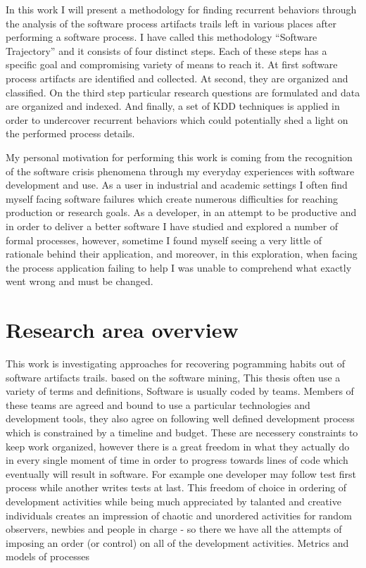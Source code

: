 In this work I will present a methodology for finding recurrent behaviors through the 
analysis of the software process artifacts trails left in various places after performing a 
software process. I have called this methodology ``Software Trajectory'' and it consists 
of four distinct steps. Each of these steps has a specific goal and compromising variety of 
means to reach it. 
At first software process artifacts are identified and collected. 
At second, they are organized and classified. 
On the third step particular research questions are formulated and data are organized and indexed. 
And finally, a set of KDD techniques is applied in order to undercover recurrent behaviors which 
could potentially shed a light on the performed process details. 

My personal motivation for performing this work is coming from the recognition of the 
software crisis phenomena through my everyday experiences with software development and use. 
As a user in industrial and academic settings I often find myself facing software failures 
which create numerous difficulties for reaching production or research goals. As a developer, 
in an attempt to be productive and in order to deliver a better software I have studied and 
explored a number of formal processes, however, sometime I found myself seeing a very little of 
rationale behind their application, and moreover, in this exploration, when facing the process
application failing to help I was unable to comprehend what exactly went wrong and must be changed. 

\section{Research area overview}
This work is investigating approaches for recovering pogramming habits out of 
software artifacts trails. based on the software mining, This thesis often use a variety of terms and
definitions, 
Software is usually coded by teams. Members of these teams are agreed and bound to use 
a particular technologies and development tools, they also agree on following well defined 
development process which is constrained by a timeline and budget. These are necessery 
constraints to keep work organized, however there is a great freedom in what they actually 
do in every single moment of time in order to progress towards lines of code which eventually 
will result in software. For example one developer may follow test first process while
another writes tests at last.  This freedom of choice in ordering of development activities 
while being much appreciated by talanted and creative individuals creates an impression 
of chaotic and unordered activities for random observers, newbies and people in 
charge - so there we have all the attempts of imposing an order 
(or control) on all of the development activities. Metrics and models of processes




